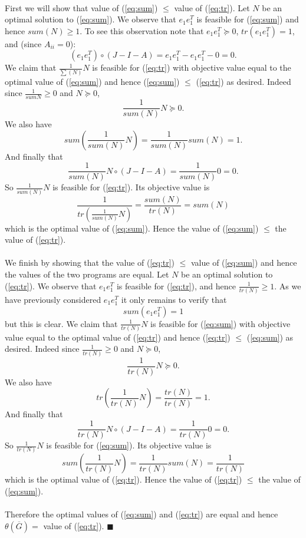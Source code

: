 \documentclass[letterpaper,12pt,oneside,onecolumn]{article}
\newcommand{\1}{\mathbbm{1}}
\begin{document}
\paragraph{}
First we will show that  value of (\ref{eq:sum}) $\leq$ value of (\ref{eq:tr}). Let $N$ be an optimal solution to (\ref{eq:sum}). We observe that $e_1e_1^T$ is feasible for (\ref{eq:sum}) and hence $sum(N) \geq 1$. To see this observation note that $e_1e_1^T \succcurlyeq 0$, $tr(e_1e_1^T) = 1$, and (since $A_{ii}= 0$):
$$(e_1e_1^T) \circ (J- I - A) = e_1e_1^T - e_1e_1^T - 0 = 0.$$
We claim that $\frac{1}{\sum(N)} N$ is feasible for (\ref{eq:tr}) with objective value equal to the optimal value of (\ref{eq:sum}) and hence (\ref{eq:sum}) $\leq$ (\ref{eq:tr}) as desired. Indeed since  $\frac{1}{sum{N}} \geq 0$ and $N \succcurlyeq 0$, 
$$\frac{1}{sum(N)}N \succcurlyeq 0.$$
We also have $$sum(\frac{1}{sum(N)} N)= \frac{1}{sum(N)}sum(N) = 1.$$
And finally that
$$\frac{1}{sum(N)} N \circ (J - I - A) = \frac{1}{sum(N)} 0 = 0.$$
So $\frac{1}{sum(N)} N$ is feasible for (\ref{eq:tr}). Its objective value is
$$\frac{1}{tr(\frac{1}{sum(N)}N)} = \frac{sum(N)}{tr(N)} = sum(N)$$
which is the optimal value of (\ref{eq:sum}). Hence the value of (\ref{eq:sum}) $\leq$ the value of (\ref{eq:tr}).
\paragraph{}
We finish by showing that the value of (\ref{eq:tr}) $\leq$ value of (\ref{eq:sum}) and hence the values of the two programs are equal. Let $N$ be an optimal solution to (\ref{eq:tr}). We observe that $e_1e_1^T$ is feasible for (\ref{eq:tr}), and hence $\frac{1}{tr(N)} \geq 1$. As we have previously considered $e_1e_1^T$ it only remains to verify that
$$sum(e_1e_1^T) = 1$$
but this is clear. We claim that $\frac{1}{tr(N)} N$ is feasible for (\ref{eq:sum}) with objective value equal to the optimal value of (\ref{eq:tr}) and hence (\ref{eq:tr}) $\leq$ (\ref{eq:sum}) as desired. Indeed since $\frac{1}{tr(N)} \geq 0$ and $N\succcurlyeq 0$,
$$\frac{1}{tr(N)} N \succcurlyeq 0.$$
We also have $$tr(\frac{1}{tr(N)}N) = \frac{tr(N)}{tr(N)} = 1.$$
And finally that
$$\frac{1}{tr(N)} N \circ(J - I - A) = \frac{1}{tr(N)} 0 = 0.$$
So $\frac{1}{tr(N)}N$ is feasible for (\ref{eq:sum}). Its objective value is
$$sum(\frac{1}{tr(N)}N) = \frac{1}{tr(N)} sum(N) = \frac{1}{tr(N)}$$
which is the optimal value of (\ref{eq:tr}). Hence the value of (\ref{eq:tr}) $\leq$ the value of (\ref{eq:sum}).
\paragraph{}
Therefore the optimal values of (\ref{eq:sum}) and (\ref{eq:tr}) are equal and hence $\theta(\overline{G}) =$ value of (\ref{eq:tr}). $\blacksquare$
\end{document}
